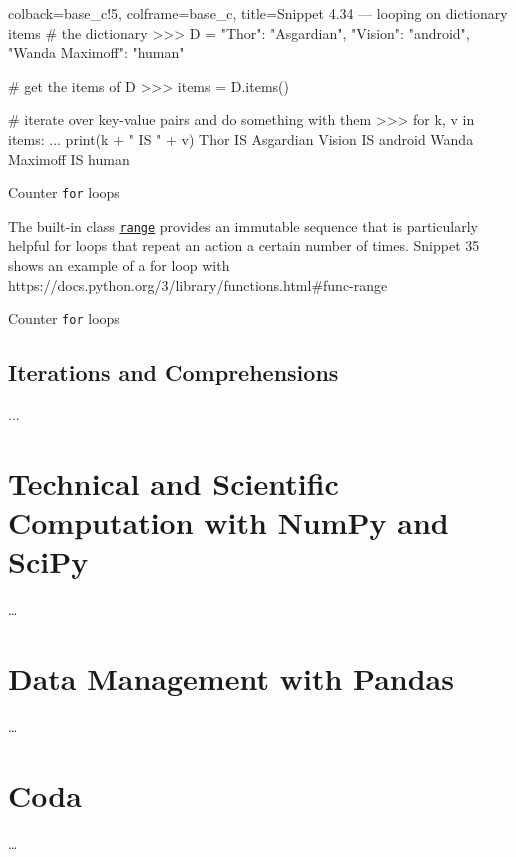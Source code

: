 \documentclass[a4paper,11pt]{book}
\numberwithin{figure}{chapter}
\numberwithin{table}{chapter}
\newcommand{\question}[1]{%
    \begin{tcolorbox}[colback=comp_c!10,colframe=comp_c,sidebyside align=top,width=\linewidth,before skip=1ex]
        #1
    \end{tcolorbox}%
    \switchcolumn%
}
\newcommand{\note}[1]{%
    \begin{tcolorbox}[colback=white!0,colframe=white!10,width=\linewidth,before skip=1ex]
        #1
    \end{tcolorbox}         
}
\begin{document}
\begin{pythoncode}[linenos=true,]{colback=base_c!5, colframe=base_c, title=\sffamily Snippet 4.34 --- looping on dictionary items}
# the dictionary
>>> D = {"Thor": "Asgardian", "Vision": "android", "Wanda Maximoff": "human"}

# get the items of D
>>> items = D.items()

# iterate over key-value pairs and do something with them
>>> for k, v in items:
...    print(k + " IS " + v)
Thor IS Asgardian
Vision IS android
Wanda Maximoff IS human
\end{pythoncode}

\begin{paracol}{2}
	\question{\raggedright Counter \texttt{for} loops}
	\note{The built-in class \href{https://docs.python.org/3/library/functions.html#func-range}{\texttt{range}} provides an immutable sequence that is particularly helpful for loops that repeat an action a certain number of times. Snippet 35 shows an example of a for loop with https://docs.python.org/3/library/functions.html#func-range}
\end{paracol}

\begin{paracol}{2}
	\question{\raggedright Counter \texttt{for} loops}
	\note{}
\end{paracol}



\section{Iterations and Comprehensions}
\label{sec:iterations_and_comprhensions}

...

\theendnotes

\chapter{Technical and Scientific Computation with NumPy and SciPy}

\ldots

\chapter{Data Management with Pandas}

\ldots

\chapter{Coda}
\ldots
\end{document}
